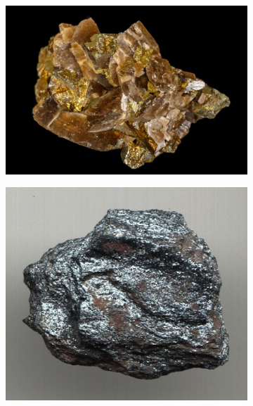 \documentclass[12pt,a4paper]{article}
\begin{document}
\begin{figure}[h!]
\begin{subfigure}{0.45\textwidth}
        \includegraphics[width=\textwidth]{Inagenes para latex/siderita.png}
        \label{siderita}
    \end{subfigure}
    \hfill
    \begin{subfigure}{0.45\textwidth}
        \centering
        \includegraphics[width=\textwidth]{Inagenes para latex/hematita.png}
        \label{hematita}


\end{subfigure}
\end{figure}
\end{document}
